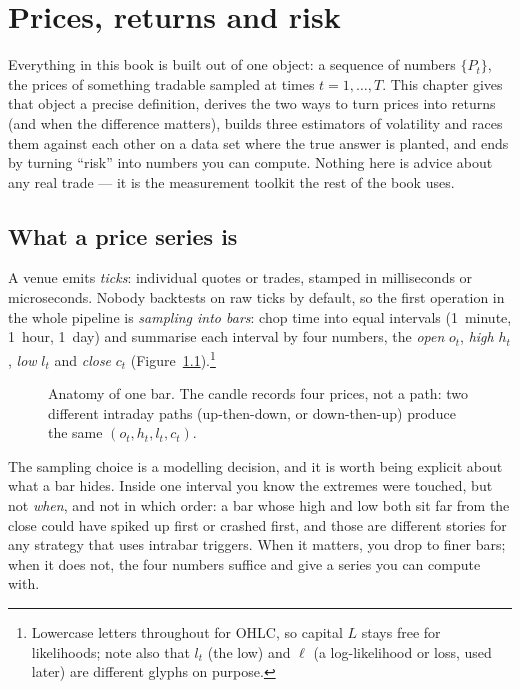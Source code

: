 \chapter{Prices, returns and risk}\label{ch:returns}

Everything in this book is built out of one object: a sequence of
numbers $\{P_t\}$, the prices of something tradable sampled at times
$t=1,\dots,T$. This chapter gives that object a precise definition,
derives the two ways to turn prices into returns (and when the
difference matters), builds three estimators of volatility and races
them against each other on a data set where the true answer is
planted, and ends by turning ``risk'' into numbers you can compute.
Nothing here is advice about any real trade --- it is the measurement
toolkit the rest of the book uses.

\section{What a price series is}\label{sec:prices}
A venue emits \emph{ticks}: individual quotes or trades, stamped in
milliseconds or microseconds. Nobody backtests on raw ticks by
default, so the first operation in the whole pipeline is
\emph{sampling into bars}: chop time into equal intervals (1~minute,
1~hour, 1~day) and summarise each interval by four numbers, the
\emph{open} $o_t$, \emph{high} $h_t$, \emph{low} $l_t$ and
\emph{close} $c_t$ (Figure~\ref{fig:candle}).\footnote{Lowercase
letters throughout for OHLC, so capital $L$ stays free for
likelihoods; note also that $l_t$ (the low) and $\ell$ (a
log-likelihood or loss, used later) are different glyphs on purpose.}

\begin{figure}[ht]\centering

\caption{Anatomy of one bar. The candle records four prices, not a
path: two different intraday paths (up-then-down, or down-then-up)
produce the same $(o_t,h_t,l_t,c_t)$.}
\label{fig:candle}
\end{figure}

The sampling choice is a modelling decision, and it is worth being
explicit about what a bar hides. Inside one interval you know the
extremes were touched, but not \emph{when}, and not in which order: a
bar whose high and low both sit far from the close could have spiked
up first or crashed first, and those are different stories for any
strategy that uses intrabar triggers. When it matters, you drop to
finer bars; when it does not, the four numbers suffice and give a
series you can compute with.


